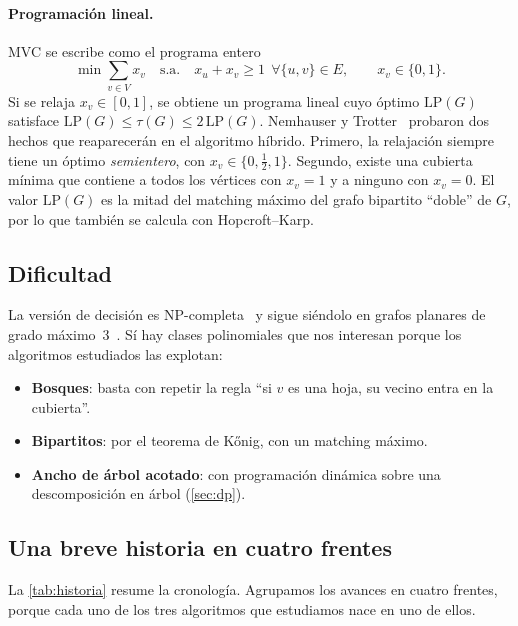 \paragraph{Programación lineal.} MVC se escribe como el programa entero
\begin{equation}\label{eq:ilp}
\min\sum_{v\in V}x_v\quad\text{s.a.}\quad x_u+x_v\ge 1\ \ \forall\{u,v\}\in E,\qquad x_v\in\{0,1\}.
\end{equation}
Si se relaja $x_v\in[0,1]$, se obtiene un programa lineal cuyo óptimo $\mathrm{LP}(G)$ satisface $\mathrm{LP}(G)\le\tau(G)\le 2\,\mathrm{LP}(G)$. Nemhauser y Trotter~\citep{nemhauser1975} probaron dos hechos que reaparecerán en el algoritmo híbrido. Primero, la relajación siempre tiene un óptimo \emph{semientero}, con $x_v\in\{0,\tfrac12,1\}$. Segundo, existe una cubierta mínima que contiene a todos los vértices con $x_v=1$ y a ninguno con $x_v=0$. El valor $\mathrm{LP}(G)$ es la mitad del matching máximo del grafo bipartito ``doble'' de $G$, por lo que también se calcula con Hopcroft--Karp.

\subsection{Dificultad}
La versión de decisión es NP-completa~\citep{karp1972} y sigue siéndolo en grafos planares de grado máximo~3~\citep{garey1979}. Sí hay clases polinomiales que nos interesan porque los algoritmos estudiados las explotan:
\begin{itemize}
  \item \textbf{Bosques}: basta con repetir la regla ``si $v$ es una hoja, su vecino entra en la cubierta''.
  \item \textbf{Bipartitos}: por el teorema de Kőnig, con un matching máximo.
  \item \textbf{Ancho de árbol acotado}: con programación dinámica sobre una descomposición en árbol (\cref{sec:dp}).
\end{itemize}

\subsection{Una breve historia en cuatro frentes}\label{sec:historia}
La \cref{tab:historia} resume la cronología. Agrupamos los avances en cuatro frentes, porque cada uno de los tres algoritmos que estudiamos nace en uno de ellos.

